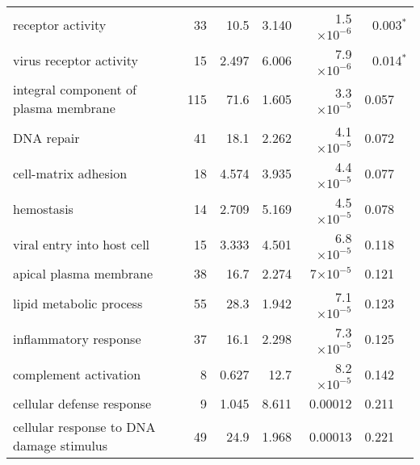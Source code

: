 \begin{longtable}{|l|r|r|r|r|r|}
                            receptor activity &                      33 &                    10.5 &      3.140 &  1.5$\times 10^{-6}$ &                0.003$\bm{^*}$ \\
                      virus receptor activity &                      15 &                   2.497 &      6.006 &  7.9$\times 10^{-6}$ &                0.014$\bm{^*}$ \\
        integral component of plasma membrane &                     115 &                    71.6 &      1.605 &  3.3$\times 10^{-5}$ &                       0.057~~ \\
                                   DNA repair &                      41 &                    18.1 &      2.262 &  4.1$\times 10^{-5}$ &                       0.072~~ \\
                         cell-matrix adhesion &                      18 &                   4.574 &      3.935 &  4.4$\times 10^{-5}$ &                       0.077~~ \\
                                   hemostasis &                      14 &                   2.709 &      5.169 &  4.5$\times 10^{-5}$ &                       0.078~~ \\
                   viral entry into host cell &                      15 &                   3.333 &      4.501 &  6.8$\times 10^{-5}$ &                       0.118~~ \\
                       apical plasma membrane &                      38 &                    16.7 &      2.274 &    7$\times 10^{-5}$ &                       0.121~~ \\
                      lipid metabolic process &                      55 &                    28.3 &      1.942 &  7.1$\times 10^{-5}$ &                       0.123~~ \\
                        inflammatory response &                      37 &                    16.1 &      2.298 &  7.3$\times 10^{-5}$ &                       0.125~~ \\
                        complement activation &                       8 &                   0.627 &       12.7 &  8.2$\times 10^{-5}$ &                       0.142~~ \\
                    cellular defense response &                       9 &                   1.045 &      8.611 &              0.00012 &                       0.211~~ \\
     cellular response to DNA damage stimulus &                      49 &                    24.9 &      1.968 &              0.00013 &                       0.221~~ \\

\end{longtable}
